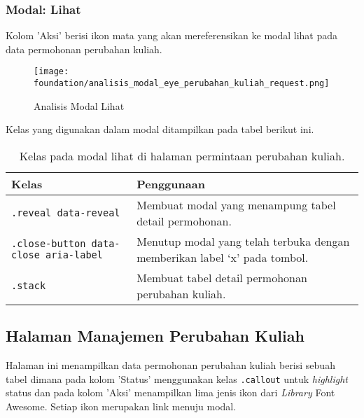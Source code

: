 \subsubsection{Modal: Lihat}
Kolom 'Aksi' berisi ikon mata yang akan mereferensikan ke modal lihat pada data permohonan perubahan kuliah. \\
\begin{figure} [H]
	\centering  
	\texttt{[image: foundation/analisis\_modal\_eye\_perubahan\_kuliah\_request.png]}
	\caption{Analisis Modal Lihat}
\end{figure}

\noindent Kelas yang digunakan dalam modal ditampilkan pada tabel berikut ini.\\
\begin{table}[H]
	\centering
	\begin{tabularx}{\textwidth}{lX}
		\toprule
		Kelas     & Penggunaan \\
		\midrule
		 \texttt{.reveal data-reveal} & Membuat modal yang menampung tabel detail permohonan.\\
		 \texttt{.close-button data-close aria-label} & Menutup modal yang telah terbuka dengan memberikan label `x' pada tombol.\\
		 \texttt{.stack} &	Membuat tabel detail permohonan perubahan kuliah.\\
		\bottomrule
	\end{tabularx}%
	\caption{Kelas pada modal lihat di halaman permintaan perubahan kuliah.}
\end{table}

\subsection{Halaman Manajemen Perubahan Kuliah}
Halaman ini menampilkan data permohonan perubahan kuliah berisi sebuah tabel dimana pada kolom 'Status' menggunakan kelas \texttt{.callout} untuk \textit{highlight} status dan pada kolom 'Aksi' menampilkan lima jenis ikon dari \textit{Library} Font Awesome. Setiap ikon merupakan link menuju modal.

